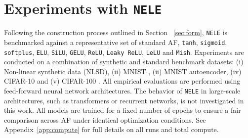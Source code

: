 \documentclass{article}
\begin{document}
\section{Experiments with \texttt{NELE}}
Following the construction process outlined in Section ~\ref{sec:form}, 
\texttt{NELE} is benchmarked against a representative set 
of standard AF, \texttt{tanh}, \texttt{sigmoid}, \texttt{softplus}, 
\texttt{ELU}, \texttt{SiLU}, \texttt{GELU}, \texttt{ReLU}, 
\texttt{Leaky ReLU}, \texttt{LeLU} \cite{BIGARELLA2026122739} and 
\texttt{Mish}. Experiments are conducted on a combination of synthetic and standard benchmark datasets: 
(i)  Non-linear synthetic data (NLSD), (ii) MNIST \cite{lecun1998mnist}, (ii) MNIST autoencoder, (iv) CIFAR-10 \cite{hope2017learning}
 and (v) CIFAR-100 \cite{krizhevsky2009cifar}. 
All empirical evaluations are performed using feed-forward neural 
network architectures. The behavior of \texttt{NELE} in 
large-scale architectures, such as transformers or 
recurrent networks, is not investigated in this work.
All models are trained for a fixed number of epochs to ensure a 
fair comparison across AF under identical optimization conditions.
See Appendix~\ref{app:compute} for full details on all 
runs and total compute.
\end{document}
